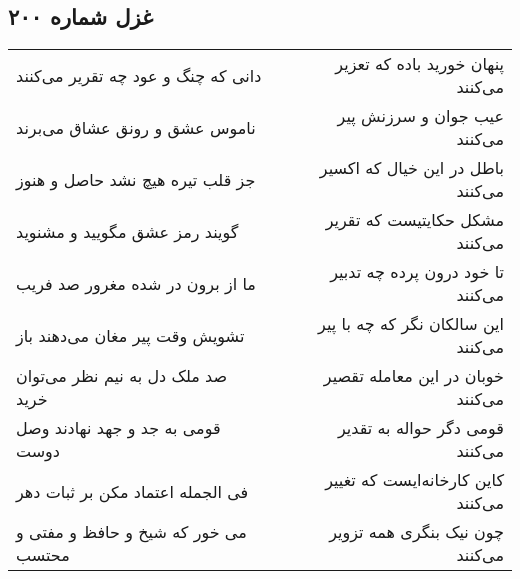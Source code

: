 \begin{center}
\section*{غزل شماره ۲۰۰}
\label{sec:sh200}
\begin{longtable}{l p{0.5cm} r}
دانی که چنگ و عود چه تقریر می‌کنند
&&
پنهان خورید باده که تعزیر می‌کنند
\\
ناموس عشق و رونق عشاق می‌برند
&&
عیب جوان و سرزنش پیر می‌کنند
\\
جز قلب تیره هیچ نشد حاصل و هنوز
&&
باطل در این خیال که اکسیر می‌کنند
\\
گویند رمز عشق مگویید و مشنوید
&&
مشکل حکایتیست که تقریر می‌کنند
\\
ما از برون در شده مغرور صد فریب
&&
تا خود درون پرده چه تدبیر می‌کنند
\\
تشویش وقت پیر مغان می‌دهند باز
&&
این سالکان نگر که چه با پیر می‌کنند
\\
صد ملک دل به نیم نظر می‌توان خرید
&&
خوبان در این معامله تقصیر می‌کنند
\\
قومی به جد و جهد نهادند وصل دوست
&&
قومی دگر حواله به تقدیر می‌کنند
\\
فی الجمله اعتماد مکن بر ثبات دهر
&&
کاین کارخانه‌ایست که تغییر می‌کنند
\\
می خور که شیخ و حافظ و مفتی و محتسب
&&
چون نیک بنگری همه تزویر می‌کنند
\\
\end{longtable}
\end{center}
